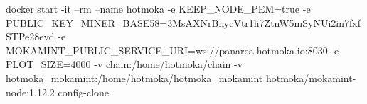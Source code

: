 \begin{shellcommandbox}\begin{ttlst}
docker start -it --rm --name hotmoka -e KEEP_NODE_PEM=true -e PUBLIC_KEY_MINER_BASE58=3MsAXNrBnycVtr1h7ZtnW5mSyNUi2in7fxfSTPe28evd -e MOKAMINT_PUBLIC_SERVICE_URI=ws://panarea.hotmoka.io:8030 -e PLOT_SIZE=4000 -v chain:/home/hotmoka/chain -v hotmoka_mokamint:/home/hotmoka/hotmoka_mokamint hotmoka/mokamint-node:1.12.2 config-clone
\end{ttlst}\end{shellcommandbox}
